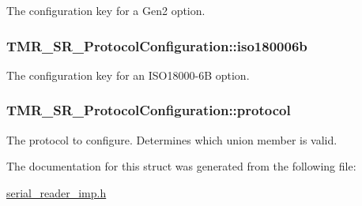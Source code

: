 The configuration key for a Gen2 option. \hypertarget{struct_t_m_r___s_r___protocol_configuration_5324779e352fa7191b5a924183af0854}{
\subsubsection[{iso180006b}]{ {\bf TMR\_\-SR\_\-ProtocolConfiguration::iso180006b}}}
\label{struct_t_m_r___s_r___protocol_configuration_5324779e352fa7191b5a924183af0854}


The configuration key for an ISO18000-6B option. \hypertarget{struct_t_m_r___s_r___protocol_configuration_b36b11fe65197b5724e25cb7d46db9ba}{
\subsubsection[{protocol}]{ {\bf TMR\_\-SR\_\-ProtocolConfiguration::protocol}}}
\label{struct_t_m_r___s_r___protocol_configuration_b36b11fe65197b5724e25cb7d46db9ba}


The protocol to configure. Determines which union member is valid. 

The documentation for this struct was generated from the following file:\begin{CompactItemize}
\item 
\hyperlink{serial__reader__imp_8h}{serial\_\-reader\_\-imp.h}\end{CompactItemize}
